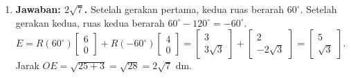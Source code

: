 \documentclass[a4paper,11pt]{article}
\newcounter{no}
\begin{document}
\begin{enumerate}[leftmargin=2em,itemsep=2pt,topsep=2pt]
\item[\textbf{5.}] \textbf{Jawaban: $2\sqrt7$.} Setelah gerakan pertama, kedua ruas berarah $60^\circ$. Setelah gerakan kedua, ruas kedua berarah $60^\circ-120^\circ=-60^\circ$. $E=R(60^\circ)\begin{bmatrix}6\\0\end{bmatrix}+R(-60^\circ)\begin{bmatrix}4\\0\end{bmatrix}=\begin{bmatrix}3\\3\sqrt3\end{bmatrix}+\begin{bmatrix}2\\-2\sqrt3\end{bmatrix}=\begin{bmatrix}5\\\sqrt3\end{bmatrix}$. Jarak $OE=\sqrt{25+3}=\sqrt{28}=2\sqrt7$ dm.
\end{enumerate}
\par{}\par\vspace{0.2em}
\end{document}
